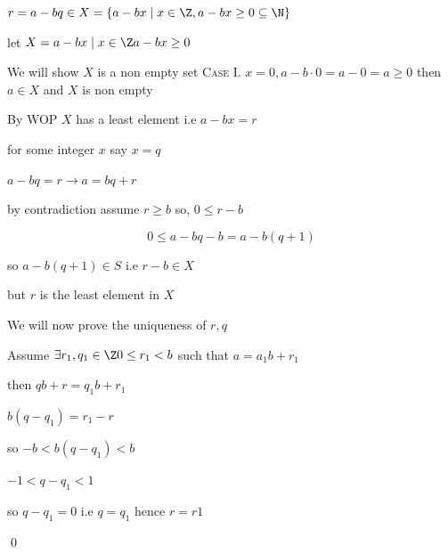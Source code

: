 
$r = a - bq \in X = \{a-bx \mid x \in \Z , a - bx \geq 0 \subseteq \N \}$

let $X = {a-bx \mid x \in \Z a - bx \geq 0}$

We will show $X$ is a non empty set
\textsc{Case I.} 
$x = 0, a - b \cdot 0 = a - 0 = a \geq 0$ then $a \in X$ and $X$ is non empty

By WOP $X$ has a least element i.e $a-bx = r$

for some integer $x$ say $x = q$

$a - bq = r \rightarrow a = bq + r$

by contradiction assume $r \geq b$ so, $0 \leq r - b$

\[
0 \leq a - bq - b = a - b (q + 1)
\]

so $a - b (q+1) \in S$ i.e $r-b \in X$

but $r$ is the least element in $X$

We will now prove the uniqueness of $r, q$

Assume $\exists r_1, q_1 \in \Z 0 \leq r_1 < b$ such that $a = a_1 b +  r_1$

then $qb +  r = q_1 b + r_1$

$b(q - q_1) = r_1 - r$

so $-b < b (q - q_1) < b$

$-1 < q - q_1 < 1$

so $q-q_1 = 0$ i.e $q = q_1$ hence $r = r1$



\qed
